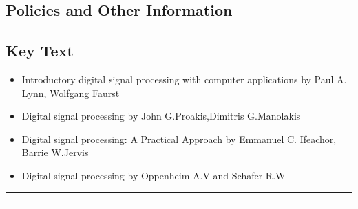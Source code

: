 
\subsection*{Policies and Other Information}
\subsection*{Key Text}
\begin{itemize}
    \item Introductory digital signal processing with computer applications by Paul A. Lynn, Wolfgang Faurst
    \item Digital signal processing by John G.Proakis,Dimitris G.Manolakis
    \item Digital signal processing: A Practical Approach by Emmanuel C. Ifeachor, Barrie W.Jervis
    \item Digital signal processing by Oppenheim A.V and Schafer R.W
\end{itemize}
\vspace{2ex}\hrule
\vspace{2ex}\hrule\vspace{2ex}